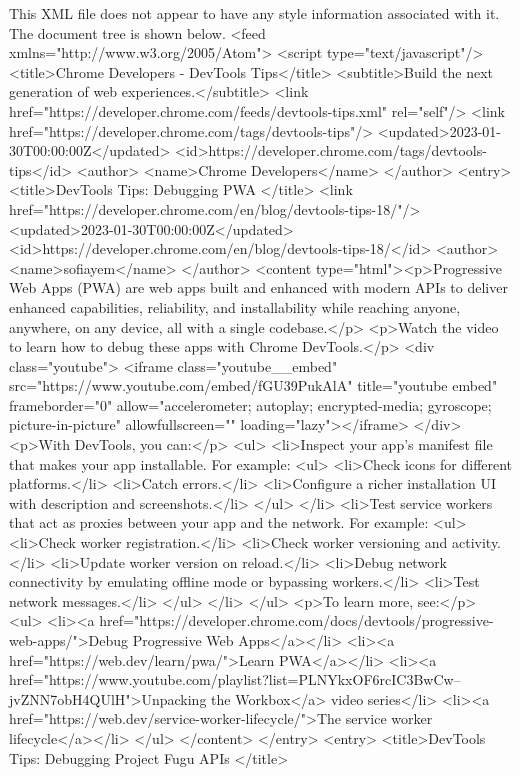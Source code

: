 This XML file does not appear to have any style information associated with it. The document tree is shown below.
<feed xmlns="http://www.w3.org/2005/Atom">
<script type="text/javascript"/>
<title>Chrome Developers - DevTools Tips</title>
<subtitle>Build the next generation of web experiences.</subtitle>
<link href="https://developer.chrome.com/feeds/devtools-tips.xml" rel="self"/>
<link href="https://developer.chrome.com/tags/devtools-tips"/>
<updated>2023-01-30T00:00:00Z</updated>
<id>https://developer.chrome.com/tags/devtools-tips</id>
<author>
<name>Chrome Developers</name>
</author>
<entry>
<title>DevTools Tips: Debugging PWA </title>
<link href="https://developer.chrome.com/en/blog/devtools-tips-18/"/>
<updated>2023-01-30T00:00:00Z</updated>
<id>https://developer.chrome.com/en/blog/devtools-tips-18/</id>
<author>
<name>sofiayem</name>
</author>
<content type="html"><p>Progressive Web Apps (PWA) are web apps built and enhanced with modern APIs to deliver enhanced capabilities, reliability, and installability while reaching anyone, anywhere, on any device, all with a single codebase.</p> <p>Watch the video to learn how to debug these apps with Chrome DevTools.</p> <div class="youtube"> <iframe class="youtube__embed" src="https://www.youtube.com/embed/fGU39PukAlA" title="youtube embed" frameborder="0" allow="accelerometer; autoplay; encrypted-media; gyroscope; picture-in-picture" allowfullscreen="" loading="lazy"></iframe> </div> <p>With DevTools, you can:</p> <ul> <li>Inspect your app's manifest file that makes your app installable. For example: <ul> <li>Check icons for different platforms.</li> <li>Catch errors.</li> <li>Configure a richer installation UI with description and screenshots.</li> </ul> </li> <li>Test service workers that act as proxies between your app and the network. For example: <ul> <li>Check worker registration.</li> <li>Check worker versioning and activity.</li> <li>Update worker version on reload.</li> <li>Debug network connectivity by emulating offline mode or bypassing workers.</li> <li>Test network messages.</li> </ul> </li> </ul> <p>To learn more, see:</p> <ul> <li><a href="https://developer.chrome.com/docs/devtools/progressive-web-apps/">Debug Progressive Web Apps</a></li> <li><a href="https://web.dev/learn/pwa/">Learn PWA</a></li> <li><a href="https://www.youtube.com/playlist?list=PLNYkxOF6rcIC3BwCw--jvZNN7obH4QUlH">Unpacking the Workbox</a> video series</li> <li><a href="https://web.dev/service-worker-lifecycle/">The service worker lifecycle</a></li> </ul> </content>
</entry>
<entry>
<title>DevTools Tips: Debugging Project Fugu APIs </title>
